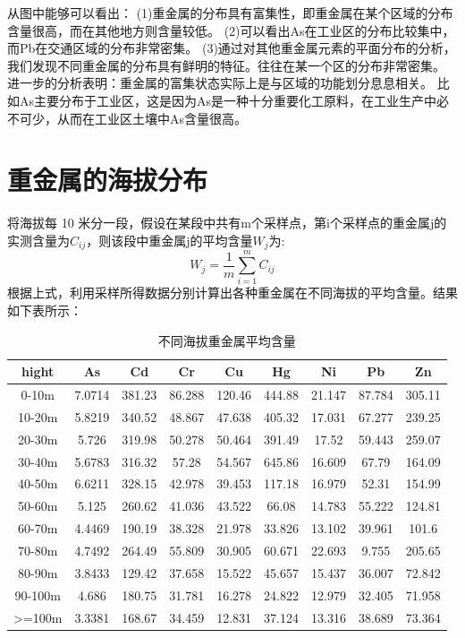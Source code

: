 \documentclass[a4paper]{article}
\begin{document}
从图中能够可以看出：
(1)重金属的分布具有富集性，即重金属在某个区域的分布含量很高，而在其他地方则含量较低。
(2)可以看出As在工业区的分布比较集中，而Pb在交通区域的分布非常密集。
(3)通过对其他重金属元素的平面分布的分析，我们发现不同重金属的分布具有鲜明的特征。往往在某一个区的分布非常密集。
进一步的分析表明：重金属的富集状态实际上是与区域的功能划分息息相关。
比如As主要分布于工业区，这是因为As是一种十分重要化工原料，在工业生产中必不可少，从而在工业区土壤中As含量很高。

\section{重金属的海拔分布}
将海拔每 10 米分一段，假设在某段中共有m个采样点，第i个采样点的重金属j的实测含量为$C_{ij}$，则该段中重金属j的平均含量$W_j$为:
\begin{equation}
W_j=\frac{1}{m}\sum_{i=1}^m C_{ij}
\end{equation}
根据上式，利用采样所得数据分别计算出各种重金属在不同海拔的平均含量。结果如下表所示：
\begin{table}[H]
		\centering
		\caption{不同海拔重金属平均含量}
		\label{average-contend}
		\begin{tabular}{c|cccccccc}
			hight	  &          	As	&   Cd   &     Cr     &   Cu   &     Hg  &    Ni   &     Pb    &   Zn  \\
			\hline
			 0-10m     	&	 7.0714  &  381.23  &  86.288  &  120.46 &   444.88 &   21.147 &   87.784  &  305.11     \\
    			10-20m     	&	 5.8219  &  340.52  &  48.867  &  47.638 &   405.32 &   17.031 &   67.277  &   239.25    \\
   			20-30m    	&	 5.726   &  319.98  &  50.278  &  50.464 &   391.49 &    17.52 &   59.443  &  259.07     \\
    			30-40m     	&	 5.6783  &  316.32  &   57.28  &  54.567 &   645.86 &   16.609 &    67.79  &  164.09     \\
    			40-50m     	&	 6.6211  &  328.15  &  42.978  &  39.453 &   117.18 &   16.979 &    52.31  &  154.99     \\
    			50-60m      	&	 5.125   & 260.62   & 41.036   & 43.522  &   66.08  &  14.783  &  55.222   & 124.81      \\
    			60-70m     	&	 4.4469  &  190.19  &  38.328  &  21.978 &   33.826 &   13.102 &   39.961  &   101.6     \\
    			70-80m     	&	 4.7492  &  264.49  &  55.809  &  30.905 &   60.671 &   22.693 &   9.755  &  205.65     \\
    			80-90m     	&	 3.8433  &  129.42  &  37.658  &  15.522 &   45.657 &   15.437 &   36.007  &  72.842     \\
    			90-100m    	&	 4.686   & 180.75   & 31.781   & 16.278  &  24.822  &  12.979  &  32.405   & 71.958      \\
    			>=100m    	&	 3.3381  &  168.67  &  34.459  &  12.831 &   37.124 &   13.316 &   38.689  &  73.364     \\
		\end{tabular}
	\end{table}
\end{document}
